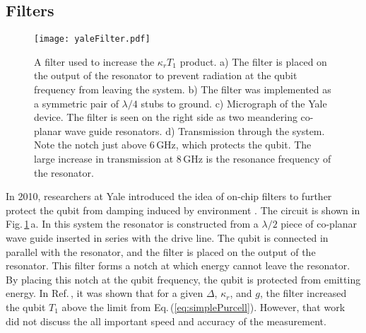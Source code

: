 \subsection{Filters}

\begin{figure}
\begin{centering}
\texttt{[image: yaleFilter.pdf]} 
\par\end{centering}
\caption{A filter used to increase the $\kappa_r T_1$ product. a) The filter is placed on the output of the resonator to prevent radiation at the qubit frequency from leaving the system. b) The filter was implemented as a symmetric pair of $\lambda/4$ stubs to ground. c) Micrograph of the Yale device. The filter is seen on the right side as two meandering co-planar wave guide resonators. d) Transmission through the system. Note the notch just above $6\,\textrm{GHz}$, which protects the qubit. The large increase in transmission at 8\,GHz is the resonance frequency of the resonator.}
\label{Fig:yaleFilter}
\end{figure}

In 2010, researchers at Yale introduced the idea of on-chip filters to further protect the qubit from damping induced by environment \cite{Reed:filter2010}.
The circuit is shown in Fig.\,\ref{Fig:yaleFilter}\,a.
In this system the resonator is constructed from a $\lambda/2$ piece of co-planar wave guide inserted in series with the drive line.
The qubit is connected in parallel with the resonator, and the filter is placed on the output of the resonator.
This filter forms a notch at which energy cannot leave the resonator.
By placing this notch at the qubit frequency, the qubit is protected from emitting energy.
In Ref.\,\cite{Reed:filter2010}, it was shown that for a given $\Delta$, $\kappa_r$, and $g$, the filter increased the qubit $T_1$ above the limit from Eq.\,(\ref{eq:simplePurcell}).
However, that work did not discuss the all important speed and accuracy of the measurement.

